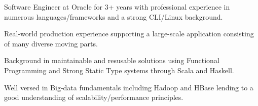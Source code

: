 

\begin{cvparagraph}


Software Engineer at Oracle for 3+ years with professional experience in numerous languages/frameworks and a strong CLI/Linux background.

Real-world production experience supporting a large-scale application consisting of many diverse moving parts.

Background in maintainable and resusable solutions using Functional Programming and Strong Static Type systems through Scala and Haskell.

Well versed in Big-data fundamentals including Hadoop and HBase lending to a good understanding of scalability/performance principles.

\end{cvparagraph}
